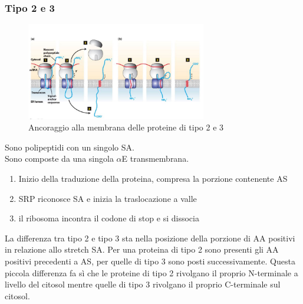        \subsubsection{Tipo 2 e 3}
            \begin{figure}[h]
                \centering
                \includegraphics[width=0.7\textwidth]{images/Tipo23.JPG}
                \caption{\small Ancoraggio alla membrana delle proteine di tipo 2 e 3}
                \label{fig:mesh1}
            \end{figure}
            Sono polipeptidi con un singolo SA. \\
            Sono composte da una singola $\alpha$E transmembrana. 
            \begin{enumerate}
                \item Inizio della traduzione della proteina, compresa la porzione contenente AS
                \item SRP riconosce SA e inizia la traslocazione a valle
                \item il ribosoma incontra il codone di stop e si dissocia
            \end{enumerate}
            La differenza tra tipo 2 e tipo 3 sta nella posizione della porzione di AA positivi in relazione allo stretch SA. Per una proteina di tipo 2 sono presenti gli AA positivi precedenti a AS, per quelle di tipo 3 sono posti successivamente.
            Questa piccola differenza fa sì che le proteine di tipo 2 rivolgano il proprio N-terminale a livello del citosol mentre quelle di tipo 3 rivolgano il proprio C-terminale sul citosol.
        
